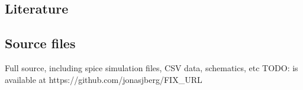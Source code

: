\documentclass[11pt,a4paper]{article}
\begin{document}
\subsection{Literature}\label{}

\subsection{Source files}\label{sources}
Full source, including spice simulation files, CSV data, schematics, etc
TODO: is available at https://github.com/jonasjberg/FIX_URL


\end{document}
